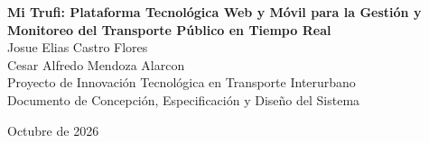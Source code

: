 \documentclass[12pt, letterpaper]{article}
\begin{document}
\begin{titlepage}
    \thispagestyle{fancy}
    \centering
    \vspace*{2.5cm}
    
    {\fontsize{14}{18}\selectfont \textbf{Mi Trufi: Plataforma Tecnológica Web y Móvil para la Gestión y Monitoreo del Transporte Público en Tiempo Real}}\\[2cm]
    
    {\large Josue Elias Castro Flores}\\[0.2cm]
    {\large Cesar Alfredo Mendoza Alarcon}\\[2.5cm]
    
    {\normalsize Proyecto de Innovación Tecnológica en Transporte Interurbano}\\[0.4cm]
    {\normalsize Documento de Concepción, Especificación y Diseño del Sistema}\\[2.5cm]
    
    \vfill
    
    {\normalsize Octubre de 2026}
    \vspace*{1cm}
\end{titlepage}

\newpage
{}
\setcounter{page}{2}

\tableofcontents
\newpage

\listoffigures
\vspace{1.5cm}
\listoftables
\newpage



\end{document}
